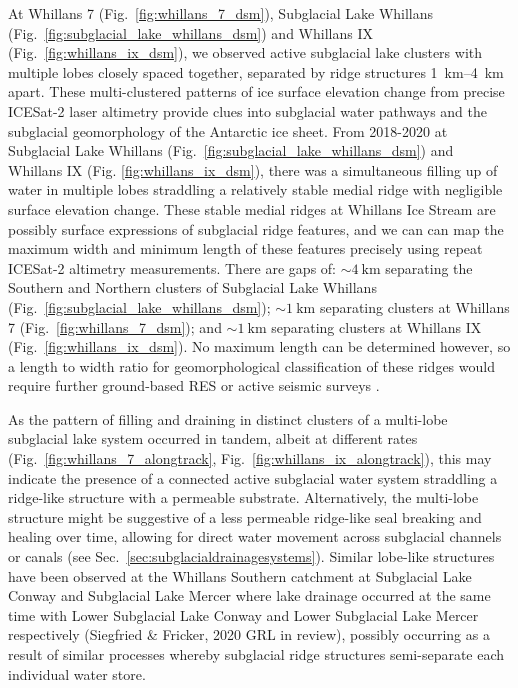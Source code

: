 At Whillans 7 (Fig.~\ref{fig:whillans_7_dsm}), Subglacial Lake Whillans (Fig.~\ref{fig:subglacial_lake_whillans_dsm}) and Whillans IX (Fig.~\ref{fig:whillans_ix_dsm}), we observed active subglacial lake clusters with multiple lobes closely spaced together, separated by ridge structures \SIrange{1}{4}{\kilo\metre} apart.
These multi-clustered patterns of ice surface elevation change from precise ICESat-2 laser altimetry provide clues into subglacial water pathways and the subglacial geomorphology of the Antarctic ice sheet.
From 2018-2020 at Subglacial Lake Whillans (Fig.~\ref{fig:subglacial_lake_whillans_dsm}) and Whillans IX (Fig. \ref{fig:whillans_ix_dsm}), there was a simultaneous filling up of water in multiple lobes straddling a relatively stable medial ridge with negligible surface elevation change.
These stable medial ridges at Whillans Ice Stream are possibly surface expressions of subglacial ridge features, and we can can map the maximum width and minimum length of these features precisely using repeat ICESat-2 altimetry measurements.
There are gaps of: $\sim\SI{4}{\kilo\metre}$ separating the Southern and Northern clusters of Subglacial Lake Whillans (Fig.~\ref{fig:subglacial_lake_whillans_dsm}); $\sim\SI{1}{\kilo\metre}$ separating clusters at Whillans 7 (Fig.~\ref{fig:whillans_7_dsm}); and $\sim\SI{1}{\kilo\metre}$ separating clusters at Whillans IX (Fig.~\ref{fig:whillans_ix_dsm}).
No maximum length can be determined however, so a length to width ratio for geomorphological classification of these ridges \citep{Elysubglacialbedformscomprise2016} would require further ground-based \gls{RES} or active seismic surveys \citep[e.g.][]{ChristiansonSubglacialLakeWhillans2012,HorganSubglacialLakeWhillans2012}.

As the pattern of filling and draining in distinct clusters of a multi-lobe subglacial lake system occurred in tandem, albeit at different rates (Fig.~\ref{fig:whillans_7_alongtrack}, Fig.~\ref{fig:whillans_ix_alongtrack}), this may indicate the presence of a connected active subglacial water system straddling a ridge-like structure with a permeable substrate.
Alternatively, the multi-lobe structure might be suggestive of a less permeable ridge-like seal breaking and healing over time, allowing for direct water movement across subglacial channels or canals (see Sec.~\ref{sec:subglacialdrainagesystems}).
Similar lobe-like structures have been observed at the Whillans Southern catchment at Subglacial Lake Conway and Subglacial Lake Mercer where lake drainage occurred at the same time with Lower Subglacial Lake Conway and Lower Subglacial Lake Mercer respectively (Siegfried \& Fricker, 2020 GRL in review), possibly occurring as a result of similar processes whereby subglacial ridge structures semi-separate each individual water store. %


